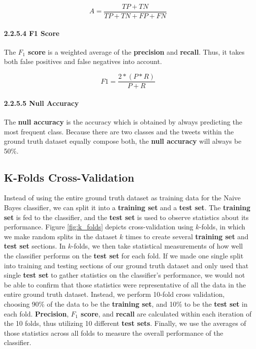 \documentclass[11pt, twoside, reqno]{book}
\begin{document}
\[A=\frac{TP+TN}{TP+TN+FP+FN}\] 

\paragraph{2.2.5.4  F1 Score}
\label{f1_score}

The \textbf{$F_{1}$ score} is a weighted average of the \textbf{precision} and \textbf{recall}. Thus, it takes both false positives and false negatives into account.

\[F1=\frac{2*(P*R)}{P+R}\] 

\paragraph{2.2.5.5  Null Accuracy}
\label{null_accuracy}

The \textbf{null accuracy} is the accuracy which is obtained by always predicting the most frequent class. Because there are two classes and the tweets within the ground truth dataset equally compose both, the \textbf{null accuracy} will always be 50\%.

\subsection{K-Folds Cross-Validation}
\label{cross_validation}

Instead of using the entire ground truth dataset as training data for the Naive Bayes classifier, we can split it into a \textbf{training set} and a \textbf{test set}. The \textbf{training set} is fed to the classifier, and the \textbf{test set} is used to observe statistics about its performance. Figure \ref{fig:k_folds} depicts cross-validation using $k$-folds, in which we make random splits in the dataset $k$ times to create several \textbf{training set} and \textbf{test set} sections. In $k$-folds, we then take statistical measurements of how well the classifier performs on the \textbf{test set} for each fold. If we made one single split into training and testing sections of our ground truth dataset and only used that single \textbf{test set} to gather statistics on the classifier's performance, we would not be able to confirm that those statistics were representative of all the data in the entire ground truth dataset. Instead, we perform 10-fold cross validation, choosing 90\% of the data to be the \textbf{training set}, and 10\% to be the \textbf{test set} in each fold. \textbf{Precision}, \textbf{$F_{1}$ score}, and \textbf{recall} are calculated within each iteration of the 10 folds, thus utilizing 10 different \textbf{test sets}. Finally, we use the averages of those statistics across all folds to measure the overall performance of the classifier. 
\end{document}
